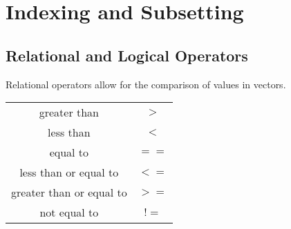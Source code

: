 \documentclass[a4paper,12pt]{article}
\begin{document}




\section{Indexing and Subsetting }
\subsection{Relational and Logical Operators}

Relational operators allow for the comparison of values in vectors.
\begin{center}
\begin{tabular}{|c|c|}
  \hline
greater than &	$>$\\
less than&	$<$\\
equal to	&$==$\\
less than or equal to&	$<=$\\
greater than or equal to&	$>=$\\
not equal to	&$!=$\\
  \hline
\end{tabular}
\end{center}
\end{document}
